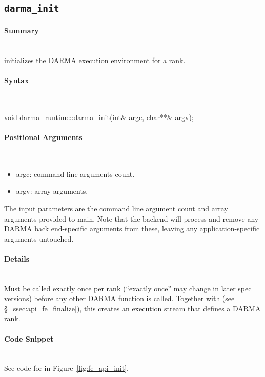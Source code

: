 
\subsection{\texttt{darma\_init}}
\label{subsec:darma_init}

\paragraph{Summary}\mbox{}\\
 initializes the \gls{DARMA} execution environment for a \gls{rank}.

\paragraph{Syntax}\mbox{}\\
\begin{CppCode}
void darma_runtime::darma_init(int& argc, char**& argv);
\end{CppCode}

\paragraph{Positional Arguments}\mbox{}\\
\begin{itemize}
\item argc: command line arguments count.
\item argv: array arguments.
\end{itemize}
The input parameters are the command line argument count 
and array arguments provided to main.  
Note that the backend will process and remove 
any \gls{DARMA} \gls{back end}-specific arguments from these, leaving any
application-specific arguments untouched.


\paragraph{Details}\mbox{}\\
Must be called exactly once per \gls{rank} (``exactly once'' may change in later
spec versions) before any other \gls{DARMA} function is called.
Together with  (see \S~\ref{ssec:api_fe_finalize}),
this creates an \gls{execution stream} that defines a \gls{DARMA} \gls{rank}.

\paragraph{Code Snippet}\mbox{}\\ 
See code for  in Figure~\ref{fig:fe_api_init}.

